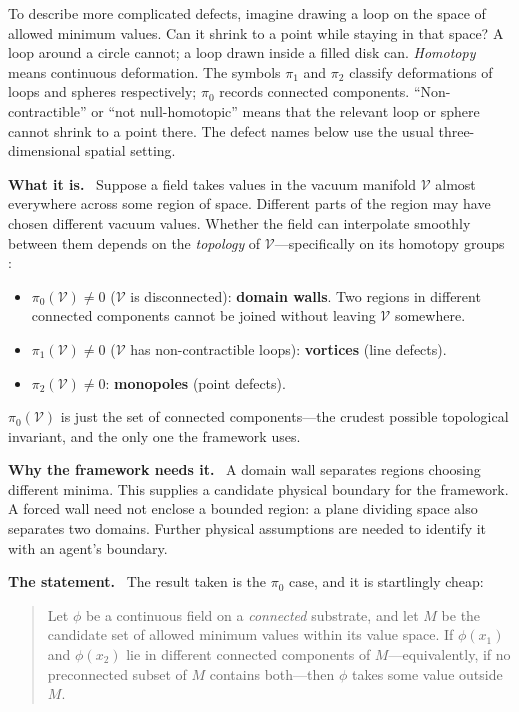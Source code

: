 \documentclass[11pt]{article}
\newcommand{\what}{\par\smallskip\noindent\textbf{What it is.}\ }
\newcommand{\why}{\par\smallskip\noindent\textbf{Why the framework needs it.}\ }
\newcommand{\statement}{\par\smallskip\noindent\textbf{The statement.}\ }
\begin{document}
To describe more complicated defects, imagine drawing a loop on the space of
allowed minimum values. Can it shrink to a point while staying in that space?
A loop around a circle cannot; a loop drawn inside a filled disk can.
\emph{Homotopy} means continuous deformation. The symbols $\pi_1$ and $\pi_2$
classify deformations of loops and spheres respectively; $\pi_0$ records
connected components. ``Non-contractible'' or ``not null-homotopic'' means
that the relevant loop or sphere cannot shrink to a point there. The defect
names below use the usual three-dimensional spatial setting.

\what
Suppose a field takes values in the vacuum manifold $\mathcal{V}$ almost
everywhere across some region of space. Different parts of the region may have
chosen different vacuum values. Whether the field can interpolate smoothly
between them depends on the \emph{topology} of $\mathcal{V}$---specifically on
its homotopy groups \citep{kibble1976}:

\begin{itemize}[leftmargin=*]
\item $\pi_0(\mathcal{V})\ne 0$ ($\mathcal{V}$ is disconnected): \textbf{domain
walls}. Two regions in different connected components cannot be joined without
leaving $\mathcal{V}$ somewhere.
\item $\pi_1(\mathcal{V})\ne 0$ ($\mathcal{V}$ has non-contractible loops):
\textbf{vortices} (line defects).
\item $\pi_2(\mathcal{V})\ne 0$: \textbf{monopoles} (point defects).
\end{itemize}

$\pi_0(\mathcal{V})$ is just the set of connected components---the crudest
possible topological invariant, and the only one the framework uses.

\why
A domain wall separates regions choosing different minima. This supplies a
candidate physical boundary for the framework. A forced wall need not enclose
a bounded region: a plane dividing space also separates two domains. Further
physical assumptions are needed to identify it with an agent's boundary.

\statement
The result taken is the $\pi_0$ case, and it is startlingly cheap:

\begin{quote}
Let $\phi$ be a continuous field on a \emph{connected} substrate, and let
$M$ be the candidate set of allowed minimum values within its value space.
If $\phi(x_1)$ and $\phi(x_2)$ lie in different
connected components of $M$---equivalently, if no preconnected subset of $M$
contains both---then $\phi$ takes some value outside $M$.
\end{quote}
\end{document}
